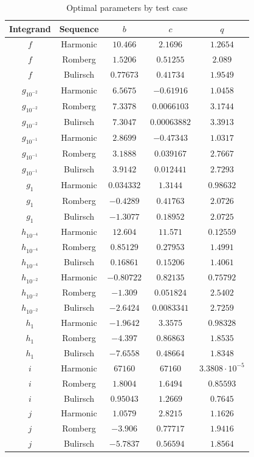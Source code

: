 \begin{table}[H]
    \centering
    \begin{tabular}{c|c||c|c|c}
        Integrand & Sequence & \(b\) & \(c\) & \(q\) \\\hline\hline
$f$ & Harmonic & \(10.466\) & \(2.1696\) & \(1.2654\) \\
$f$ & Romberg & \(1.5206\) & \(0.51255\) & \(2.089\) \\
$f$ & Bulirsch & \(0.77673\) & \(0.41734\) & \(1.9549\) \\
$g_{10^{-2}}$ & Harmonic & \(6.5675\) & \(-0.61916\) & \(1.0458\) \\
$g_{10^{-2}}$ & Romberg & \(7.3378\) & \(0.0066103\) & \(3.1744\) \\
$g_{10^{-2}}$ & Bulirsch & \(7.3047\) & \(0.00063882\) & \(3.3913\) \\
$g_{10^{-1}}$ & Harmonic & \(2.8699\) & \(-0.47343\) & \(1.0317\) \\
$g_{10^{-1}}$ & Romberg & \(3.1888\) & \(0.039167\) & \(2.7667\) \\
$g_{10^{-1}}$ & Bulirsch & \(3.9142\) & \(0.012441\) & \(2.7293\) \\
$g_1$ & Harmonic & \(0.034332\) & \(1.3144\) & \(0.98632\) \\
$g_1$ & Romberg & \(-0.4289\) & \(0.41763\) & \(2.0726\) \\
$g_1$ & Bulirsch & \(-1.3077\) & \(0.18952\) & \(2.0725\) \\
$h_{10^{-4}}$ & Harmonic & \(12.604\) & \(11.571\) & \(0.12559\) \\
$h_{10^{-4}}$ & Romberg & \(0.85129\) & \(0.27953\) & \(1.4991\) \\
$h_{10^{-4}}$ & Bulirsch & \(0.16861\) & \(0.15206\) & \(1.4061\) \\
$h_{10^{-2}}$ & Harmonic & \(-0.80722\) & \(0.82135\) & \(0.75792\) \\
$h_{10^{-2}}$ & Romberg & \(-1.309\) & \(0.051824\) & \(2.5402\) \\
$h_{10^{-2}}$ & Bulirsch & \(-2.6424\) & \(0.0083341\) & \(2.7259\) \\
$h_1$ & Harmonic & \(-1.9642\) & \(3.3575\) & \(0.98328\) \\
$h_1$ & Romberg & \(-4.397\) & \(0.86863\) & \(1.8535\) \\
$h_1$ & Bulirsch & \(-7.6558\) & \(0.48664\) & \(1.8348\) \\
$i$ & Harmonic & \(67160\) & \(67160\) & \(3.3808\cdot 10^{-5}\) \\
$i$ & Romberg & \(1.8004\) & \(1.6494\) & \(0.85593\) \\
$i$ & Bulirsch & \(0.95043\) & \(1.2669\) & \(0.7645\) \\
$j$ & Harmonic & \(1.0579\) & \(2.8215\) & \(1.1626\) \\
$j$ & Romberg & \(-3.906\) & \(0.77717\) & \(1.9416\) \\
$j$ & Bulirsch & \(-5.7837\) & \(0.56594\) & \(1.8564\)
    \end{tabular}
    \caption{Optimal parameters by test case}
    \label{tab:my_label}
\end{table}